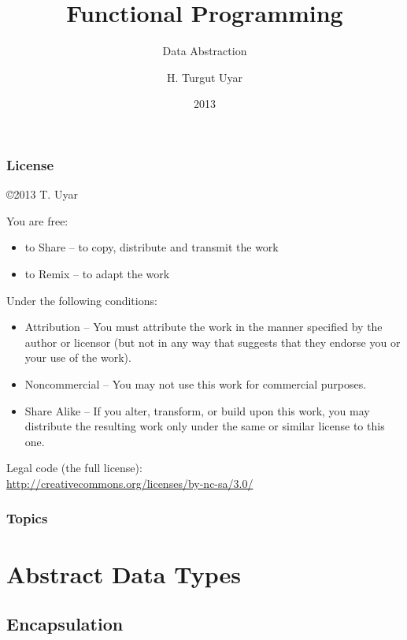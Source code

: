 \documentclass[dvipsnames]{beamer}
\title{Functional Programming}
\subtitle{Data Abstraction}
\author{H. Turgut Uyar}
\date{2013}
\theoremstyle{plain}
\begin{document}
\begin{frame}
  \titlepage
\end{frame}

\begin{frame}
  \frametitle{License}

  \hfill
  \copyright 2013 T. Uyar

  \vfill
  \begin{tiny}
    You are free:
    \begin{itemize}
      \item to Share -- to copy, distribute and transmit the work
      \item to Remix -- to adapt the work
    \end{itemize}

    Under the following conditions:
    \begin{itemize}
      \item Attribution -- You must attribute the work in the manner specified by
        the author or licensor (but not in any way that suggests that they
        endorse you or your use of the work).

      \item Noncommercial -- You may not use this work for commercial purposes.

      \item Share Alike -- If you alter, transform, or build upon this work, you
        may distribute the resulting work only under the same or similar license
        to this one.
    \end{itemize}
  \end{tiny}

  \vfill
  Legal code (the full license):\\
  \url{http://creativecommons.org/licenses/by-nc-sa/3.0/}
\end{frame}

\begin{frame}
  \frametitle{Topics}
  \tableofcontents
\end{frame}

\section{Abstract Data Types}

\subsection{Encapsulation}
\end{document}
